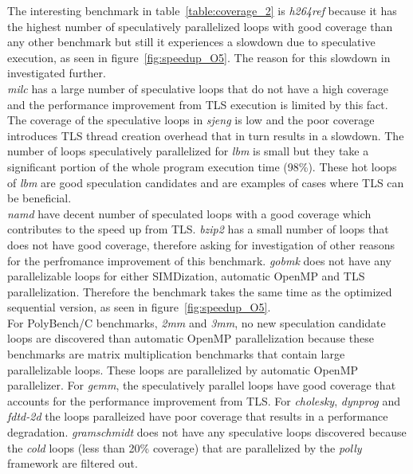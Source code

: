 \documentclass[10pt]{report}          %
\begin{document}
The interesting benchmark in table~\ref{table:coverage_2} is \textit{h264ref} because it has the highest number of speculatively parallelized loops with good coverage than any other benchmark but still it experiences a slowdown due to speculative execution, as seen in figure~\ref{fig:speedup_O5}.  The reason for this slowdown in investigated further. \\ \textit{milc} has a large number of speculative loops that do not have a high coverage and the performance improvement from TLS execution is limited by this fact.  The coverage of the speculative loops in \textit{sjeng} is low and the poor coverage introduces TLS thread creation overhead that in turn results in a slowdown.  The number of loops speculatively parallelized for \textit{lbm} is small but they take a significant portion of the whole program execution time (98\%).  These hot loops of \textit{lbm} are good speculation candidates and are examples of cases where TLS can be beneficial. \\ \textit{namd} have decent number of speculated loops with a good coverage which contributes to the speed up from TLS.  \textit{bzip2} has a small number of loops that does not have good coverage, therefore asking for investigation of other reasons for the perfromance improvement of this benchmark. \textit{gobmk} does not have any parallelizable loops for either SIMDization, automatic OpenMP and TLS parallelization. Therefore the benchmark takes the same time as the optimized sequential version, as seen in figure~\ref{fig:speedup_O5}. \\
For PolyBench/C benchmarks, \textit{2mm} and \textit{3mm}, no new speculation candidate loops are discovered than automatic OpenMP parallelization because these benchmarks are matrix multiplication benchmarks that contain large parallelizable loops.  These loops are parallelized by automatic OpenMP parallelizer. For \textit{gemm}, the speculatively parallel loops have good coverage that accounts for the performance improvement from TLS.  For \textit{cholesky}, \textit{dynprog} and \textit{fdtd-2d} the loops paralleized have poor coverage that results in a performance degradation. \textit{gramschmidt} does not have any speculative loops discovered because the \textit{cold} loops (less than 20\% coverage) that are parallelized by the \textit{polly} framework are filtered out.
\end{document}
